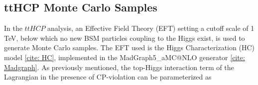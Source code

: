\begin{table}[h!]
  \centering
\caption{Summary of nominal background samples}
\label{tab:bckg_samples}
\end{table}  

\subsection{ttHCP Monte Carlo Samples} \label{sec:ttHCPMC} 

In the $ttH CP$ analysis, an Effective Field Theory (EFT) setting a cutoff scale of 1 TeV, below which no new BSM particles coupling to the Higgs exist, is used to generate Monte Carlo samples. The EFT used is the Higgs Characterization (HC) model \ref{cite: HC}, implemented in the  MadGraph5_aMC@NLO generator \ref{cite: Madgraph}. As previously mentioned, the top-Higgs interaction term of the Lagrangian in the presence of CP-violation can be parameterized as

